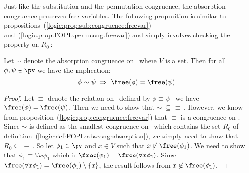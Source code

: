 Just like the substitution and the permutation congruence, the
absorption congruence preserves free variables. The following
proposition is similar to
propositions~(\ref{logic:prop:sub:congruence:freevar})
and~(\ref{logic:prop:FOPL:permcong:freevar}) and simply involves
checking the property on  $R_{0}$\,:
\begin{prop}\label{logic:prop:FOPL:abscong:freevar}
Let $\sim$ denote the absorption congruence on \pv\ where $V$ is a
set. Then for all $\phi,\psi\in\pv$ we have the implication:
    \[
    \phi\sim\psi\ \Rightarrow\ \free(\phi)=\free(\psi)
    \]
\end{prop}
\begin{proof}
Let $\equiv$ denote the relation on \pv\ defined by $\phi\equiv\psi$
\ifand\ we have $\free(\phi)=\free(\psi)$. Then we need to show that
$\sim\,\subseteq\,\equiv\,$. However, we know from
proposition~(\ref{logic:prop:congruence:freevar}) that $\equiv$ is a
congruence on \pv. Since $\sim$ is defined as the smallest
congruence on \pv\ which contains the set $R_{0}$ of
definition~(\ref{logic:def:FOPL:abscong:absorption}), we simply need
to show that $R_{0}\subseteq\,\equiv\,$. So let $\phi_{1}\in\pv$ and
$x\in V$ such that $x\not\in\free(\phi_{1})$. We need to show that
$\phi_{1}\equiv\forall x\phi_{1}$ which is
$\free(\phi_{1})=\free(\forall x\phi_{1})$. Since $\free(\forall
x\phi_{1})=\free(\phi_{1})\setminus\{x\}$, the result follows from
$x\not\in\free(\phi_{1})$.
\end{proof}


